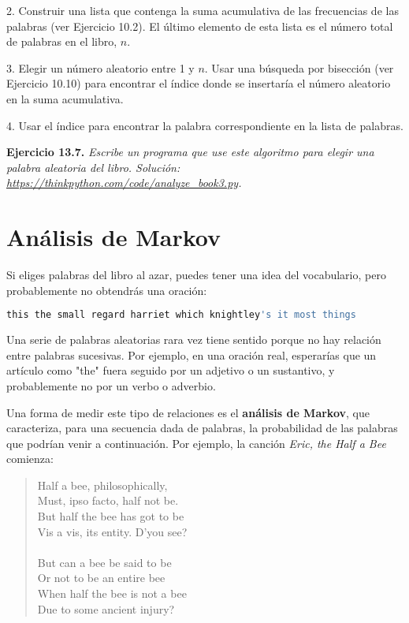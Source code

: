 2. Construir una lista que contenga la suma acumulativa de las frecuencias de las palabras (ver Ejercicio 10.2). El último elemento de esta lista es el número total de palabras en el libro, \(n\).

3. Elegir un número aleatorio entre 1 y \(n\). Usar una búsqueda por bisección (ver Ejercicio 10.10) para encontrar el índice donde se insertaría el número aleatorio en la suma acumulativa.

4. Usar el índice para encontrar la palabra correspondiente en la lista de palabras.

\textbf{Ejercicio 13.7.} \textit{Escribe un programa que use este algoritmo para elegir una palabra aleatoria del libro. Solución: \url{https://thinkpython.com/code/analyze_book3.py}.}

\section{Análisis de Markov}

Si eliges palabras del libro al azar, puedes tener una idea del vocabulario, pero probablemente no obtendrás una oración:

\begin{lstlisting}[language=Python]
this the small regard harriet which knightley's it most things
\end{lstlisting}

Una serie de palabras aleatorias rara vez tiene sentido porque no hay relación entre palabras sucesivas. Por ejemplo, en una oración real, esperarías que un artículo como "the" fuera seguido por un adjetivo o un sustantivo, y probablemente no por un verbo o adverbio.

Una forma de medir este tipo de relaciones es el \textbf{análisis de Markov}, que caracteriza, para una secuencia dada de palabras, la probabilidad de las palabras que podrían venir a continuación. Por ejemplo, la canción \textit{Eric, the Half a Bee} comienza:

\begin{quote}
Half a bee, philosophically,\\
Must, ipso facto, half not be.\\
But half the bee has got to be\\
Vis a vis, its entity. D'you see?\\
\\
But can a bee be said to be\\
Or not to be an entire bee\\
When half the bee is not a bee\\
Due to some ancient injury?
\end{quote}

